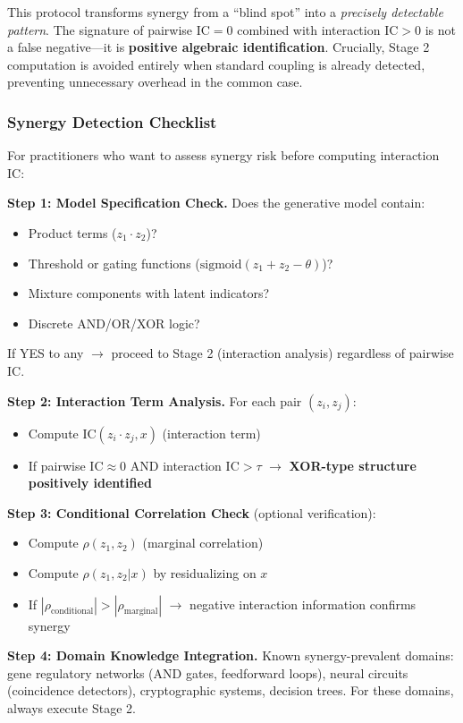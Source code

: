 \documentclass[10pt]{article} %
\theoremstyle{plain}
\theoremstyle{definition}
\newcommand{\IC}{\mathrm{IC}}  %
\begin{document}
\begin{tcolorbox}[breakable, colback=blue!5, colframe=blue!50!black, title=\textbf{The Complete Two-Stage IC Diagnostic Protocol}, fonttitle=\bfseries]
This protocol transforms synergy from a ``blind spot'' into a \emph{precisely detectable pattern}. The signature of pairwise $\IC = 0$ combined with interaction $\IC > 0$ is not a false negative---it is \textbf{positive algebraic identification}. Crucially, Stage 2 computation is avoided entirely when standard coupling is already detected, preventing unnecessary overhead in the common case.
\end{tcolorbox}

\subsubsection{Synergy Detection Checklist}

For practitioners who want to assess synergy risk before computing interaction IC:

\begin{tcolorbox}[breakable, colback=gray!10, colframe=black, title=\textbf{Synergy Detection Protocol (Detailed)}, fonttitle=\bfseries]
\textbf{Step 1: Model Specification Check.} Does the generative model contain:
\begin{itemize}
    \item Product terms ($z_1 \cdot z_2$)?
    \item Threshold or gating functions ($\text{sigmoid}(z_1 + z_2 - \theta)$)?
    \item Mixture components with latent indicators?
    \item Discrete AND/OR/XOR logic?
\end{itemize}
If YES to any $\rightarrow$ proceed to Stage 2 (interaction analysis) regardless of pairwise IC.

\textbf{Step 2: Interaction Term Analysis.} For each pair $(z_i, z_j)$:
\begin{itemize}
    \item Compute $\IC(z_i \cdot z_j, x)$ (interaction term)
    \item If pairwise $\IC \approx 0$ AND interaction $\IC > \tau$ $\rightarrow$ \textbf{XOR-type structure positively identified}
\end{itemize}

\textbf{Step 3: Conditional Correlation Check} (optional verification):
\begin{itemize}
    \item Compute $\rho(z_1, z_2)$ (marginal correlation)
    \item Compute $\rho(z_1, z_2 | x)$ by residualizing on $x$
    \item If $|\rho_{\text{conditional}}| > |\rho_{\text{marginal}}|$ $\rightarrow$ negative interaction information confirms synergy
\end{itemize}

\textbf{Step 4: Domain Knowledge Integration.}
Known synergy-prevalent domains: gene regulatory networks (AND gates, feedforward loops), neural circuits (coincidence detectors), cryptographic systems, decision trees. For these domains, always execute Stage 2.
\end{tcolorbox}
\end{document}
